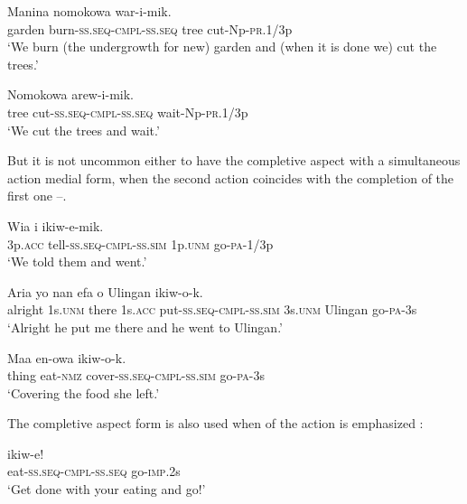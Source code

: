 \ea%
\label{ex:3:x1041}
\gll Manina  nomokowa war-i-mik. \\
garden burn-\textsc{ss}.\textsc{seq}-\textsc{cmpl}-\textsc{ss}.\textsc{seq} tree cut-Np-\textsc{pr}.1/3p\\
\glt`We burn (the undergrowth for new) garden and (when it is done we) cut the trees.'
\z

\ea%
\label{ex:3:x1042}
\gll Nomokowa  arew-i-mik. \\
tree cut-\textsc{ss}.\textsc{seq}-\textsc{cmpl}-\textsc{ss}.\textsc{seq} wait-Np-\textsc{pr}.1/3p\\
\glt`We cut the trees and wait.'
\z

But it is not uncommon either to have the completive aspect with a simultaneous action medial form, when the second action coincides with the completion of the first one  --.

\ea%
\label{ex:3:x363}
\gll Wia  i ikiw-e-mik. \\
3p.\textsc{acc} tell-\textsc{ss}.\textsc{seq}-\textsc{cmpl}-\textsc{ss}.\textsc{sim} 1p.\textsc{unm} go-\textsc{pa}-1/3p\\
\glt`We told them and went.' 
\z

\ea%
\label{ex:3:x1040}
\gll Aria yo nan efa  o Ulingan ikiw-o-k.\\
alright 1s.\textsc{unm} there 1s.\textsc{acc} put-\textsc{ss}.\textsc{seq}-\textsc{cmpl}-\textsc{ss}.\textsc{sim} 3s.\textsc{unm} Ulingan go-\textsc{pa}-3s\\
\glt`Alright he put me there and he went to Ulingan.'
\z

\ea%
\label{ex:3:x1043}
\gll Maa en-owa  ikiw-o-k. \\
thing eat-\textsc{nmz} cover-\textsc{ss}.\textsc{seq}-\textsc{cmpl}-\textsc{ss}.\textsc{sim} go-\textsc{pa}-3s\\
\glt`Covering the food she left.'
\z

The completive aspect form is also used when  of the action is emphasized  :

\ea%
\label{ex:3:x364}
\gll {} ikiw-e! \\
eat-\textsc{ss}.\textsc{seq}-\textsc{cmpl}-\textsc{ss}.\textsc{seq} go-\textsc{imp}.2s\\
\glt`Get done with your eating and go!'
\z 

